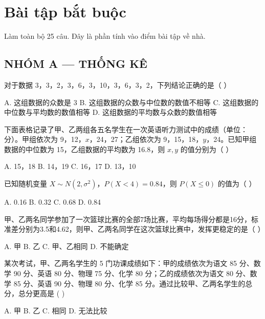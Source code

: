\documentclass[11pt, a4paper]{article}
\begin{document}

\section{Bài tập bắt buộc}

Làm toàn bộ 25 câu. Đây là phần tính vào điểm bài tập về nhà.

\subsection*{NHÓM A — THỐNG KÊ}

\begin{baitap}[1]
对于数据 3，3，2，3，6，3，10，3，6，3，2，下列结论正确的是（ ）
\par\vspace{3pt}
\noindent A. 这组数据的众数是 3 \quad B. 这组数据的众数与中位数的数值不相等 \quad C. 这组数据的中位数与平均数的数值相等 \quad D. 这组数据的平均数与众数的数值相等
\end{baitap}

\begin{baitap}[2]
下面表格记录了甲、乙两组各五名学生在一次英语听力测试中的成绩（单位：分）。甲组依次为 9，12，$x$，24，27；乙组依次为 9，15，18，$y$，24。已知甲组数据的中位数为 15，乙组数据的平均数为 16.8，则 $x,y$ 的值分别为（ ）
\par\vspace{3pt}
\noindent A. 15，18 \quad B. 14，19 \quad C. 16，17 \quad D. 13，10
\end{baitap}

\begin{baitap}[3]
已知随机变量 $X\sim N(2,\sigma^2)$，$P(X<4)=0.84$，则 $P(X\le0)$ 的值为（ ）
\par\vspace{3pt}
\noindent A. 0.16 \quad B. 0.32 \quad C. 0.68 \quad D. 0.84
\end{baitap}

\begin{baitap}[4]
甲、乙两名同学参加了一次篮球比赛的全部7场比赛，平均每场得分都是16分，标准差分别为3.5和4.62，则甲、乙两名同学在这次篮球比赛中，发挥更稳定的是（ ）
\par\vspace{3pt}
\noindent A. 甲 \quad B. 乙 \quad C. 甲、乙相同 \quad D. 不能确定
\end{baitap}

\begin{baitap}[5]
某次考试，甲、乙两名学生的 5 门功课成绩如下：甲的成绩依次为语文 85 分、数学 90 分、英语 80 分、物理 75 分、化学 80 分；乙的成绩依次为语文 80 分、数学 85 分、英语 90 分、物理 80 分、化学 85 分。通过比较甲、乙两名学生的总分，总分更高是 ( )
\par\vspace{3pt}
\noindent A. 甲 \quad B. 乙 \quad C. 相同 \quad D. 无法比较
\end{baitap}
\end{document}
